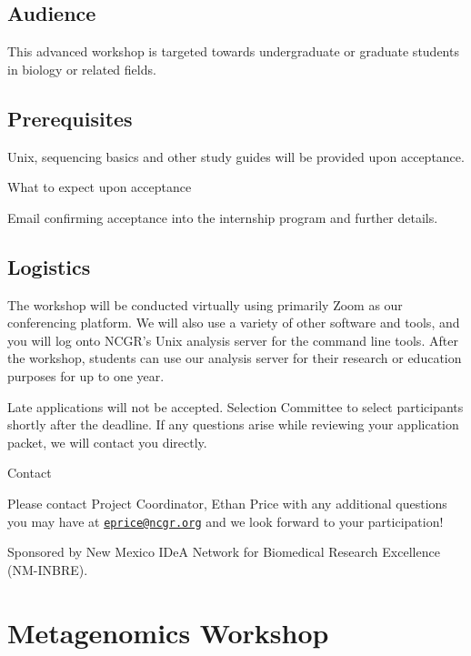 \documentclass[
]{book}
\begin{document}
\hypertarget{audience-1}{%
\section*{Audience}\label{audience-1}}

This advanced workshop is targeted towards undergraduate or graduate students in biology or related fields.

\hypertarget{prerequisites-1}{%
\section*{Prerequisites}\label{prerequisites-1}}

Unix, sequencing basics and other study guides will be provided upon acceptance.

What to expect upon acceptance

Email confirming acceptance into the internship program and further details.

\hypertarget{logistics-1}{%
\section*{Logistics}\label{logistics-1}}

The workshop will be conducted virtually using primarily Zoom as our conferencing platform. We will also use a variety of other software and tools, and you will log onto NCGR's Unix analysis server for the command line tools. After the workshop, students can use our analysis server for their research or education purposes for up to one year.

Late applications will not be accepted. Selection Committee to select participants shortly after the deadline. If any questions arise while reviewing your application packet, we will contact you directly.

Contact

Please contact Project Coordinator, Ethan Price with any additional questions you may have at \href{mailto:eprice@ncgr.org}{\nolinkurl{eprice@ncgr.org}} and we look forward to your participation!

Sponsored by New Mexico IDeA Network for Biomedical Research Excellence (NM-INBRE).

\hypertarget{metagenomics-workshop}{%
\chapter*{Metagenomics Workshop}\label{metagenomics-workshop}}
\end{document}
